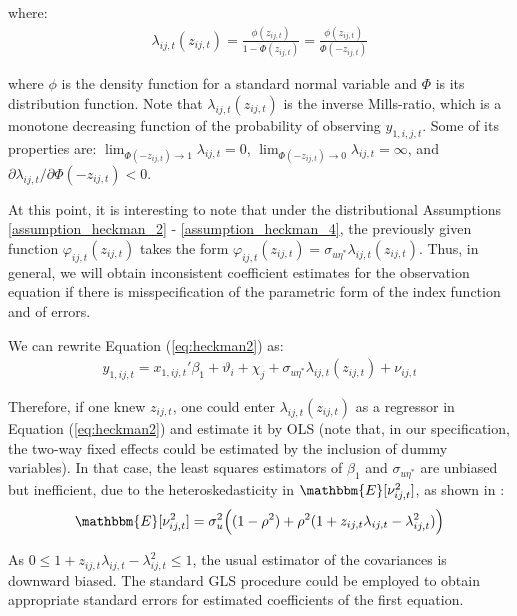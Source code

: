 \noindent where:
\begin{align} \label{inverse_mills_heckman}
    \lambda_{ij,t}(z_{ij,t}) = \frac{\phi(z_{ij,t})}{1 - \Phi(z_{ij,t})} = \frac{\phi(z_{ij,t})}{\Phi(-z_{ij,t})}
\end{align}

\noindent where $\phi$ is the density function for a standard normal variable and $\Phi$ is its distribution function. Note that $\lambda_{ij,t}(z_{ij,t})$ is the inverse Mills-ratio, which is a monotone decreasing function of the probability of observing $y_{1,i,j,t}$. Some of its properties are: $\lim_{\Phi(-z_{ij,t}) \xrightarrow{} 1} \lambda_{ij,t} = 0$, $\lim_{\Phi(-z_{ij,t}) \xrightarrow{} 0} \lambda_{ij,t} = \infty$, and $\partial\lambda_{ij,t}/\partial \Phi(-z_{ij,t}) < 0$.

At this point, it is interesting to note that under the distributional Assumptions \ref{assumption_heckman_2} - \ref{assumption_heckman_4}, the previously given function $\varphi_{ij,t}(z_{ij,t})$ takes the form $\varphi_{ij,t}(z_{ij,t}) = \sigma_{u\eta^*} \lambda_{ij,t}(z_{ij,t})$. Thus, in general, we will obtain inconsistent coefficient estimates for the observation equation if there is misspecification of the parametric form of the index function and of errors.

We can rewrite Equation (\ref{eq:heckman2}) as:
\begin{align}
    y_{1,ij,t} =  x_{1,ij,t}'\beta_1 + \vartheta_i + \chi_j + \sigma_{u\eta^*} \lambda_{ij,t}(z_{ij,t}) + \nu_{ij,t}
    \label{eq:heckman2_revised}
\end{align}

Therefore, if one knew $z_{ij,t}$, one could enter $\lambda_{ij,t}(z_{ij,t})$ as a regressor in Equation (\ref{eq:heckman2}) and estimate it by OLS (note that, in our specification, the two-way fixed effects could be estimated by the inclusion of dummy variables). In that case, the least squares estimators of $\beta_1$ and $\sigma_{u\eta^*}$ are unbiased but inefficient, due to the heteroskedasticity in $\mathbbm{E}[\nu_{ij,t}^2]$, as shown in \cite{heckman1979sample}:
\begin{align*}
    \mathbbm{E}[\nu_{ij,t}^2] = \sigma_u^2 \Big((1-\rho^2) + \rho^2(1+ z_{ij,t} \lambda_{ij,t} - \lambda_{ij,t}^2)\Big)
\end{align*}

As $0 \leq 1+ z_{ij,t} \lambda_{ij,t} - \lambda_{ij,t}^2 \leq 1$, the usual estimator of the covariances is downward biased. The standard GLS procedure could be employed to obtain appropriate standard errors for estimated coefficients of the first equation.


